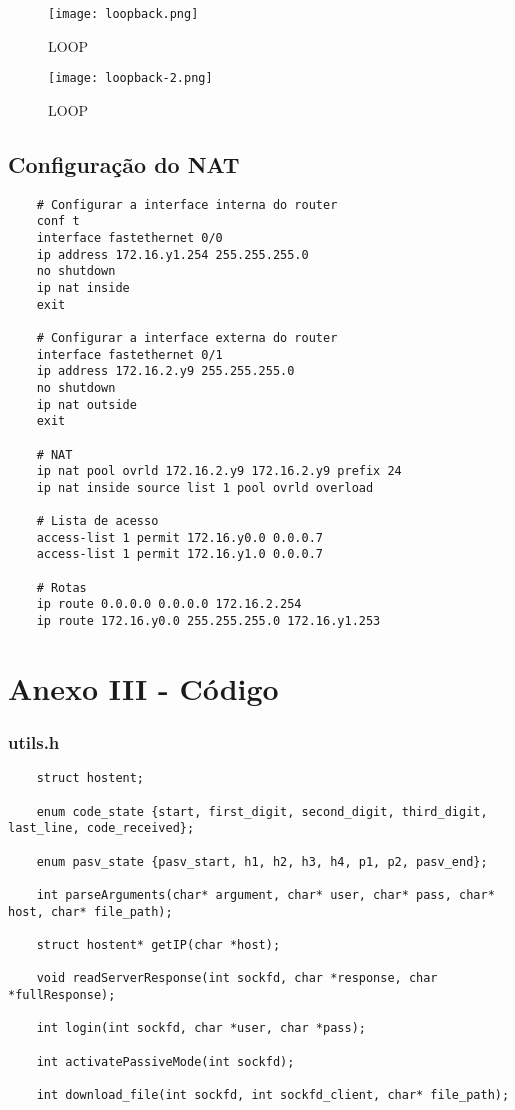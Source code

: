 \documentclass[article, a4paper, 11pt, oneside]{memoir}
\begin{document}
\begin{figure}[h]
	\centering
\texttt{[image: loopback.png]}
\caption{LOOP}
\end{figure}

\begin{figure}[h]
	\centering
\texttt{[image: loopback-2.png]}
\caption{LOOP}
\end{figure}

\newpage
\subsection{Configuração do NAT}
\begin{lstlisting}
	# Configurar a interface interna do router
	conf t 
	interface fastethernet 0/0
	ip address 172.16.y1.254 255.255.255.0 
	no shutdown 
	ip nat inside 
	exit 
	
	# Configurar a interface externa do router
	interface fastethernet 0/1
	ip address 172.16.2.y9 255.255.255.0 
	no shutdown 
	ip nat outside 
	exit 
	
	# NAT
	ip nat pool ovrld 172.16.2.y9 172.16.2.y9 prefix 24 
	ip nat inside source list 1 pool ovrld overload 
	
	# Lista de acesso
	access-list 1 permit 172.16.y0.0 0.0.0.7 
	access-list 1 permit 172.16.y1.0 0.0.0.7 
	
	# Rotas
	ip route 0.0.0.0 0.0.0.0 172.16.2.254 
	ip route 172.16.y0.0 255.255.255.0 172.16.y1.253 
\end{lstlisting}

\newpage
\section{Anexo III - Código}
\subsubsection{utils.h}
\begin{lstlisting}
	struct hostent;

	enum code_state {start, first_digit, second_digit, third_digit, last_line, code_received};
	
	enum pasv_state {pasv_start, h1, h2, h3, h4, p1, p2, pasv_end};
	
	int parseArguments(char* argument, char* user, char* pass, char* host, char* file_path);
	
	struct hostent* getIP(char *host);
	
	void readServerResponse(int sockfd, char *response, char *fullResponse);
	
	int login(int sockfd, char *user, char *pass);
	
	int activatePassiveMode(int sockfd);
	
	int download_file(int sockfd, int sockfd_client, char* file_path);
\end{lstlisting}
\end{document}

